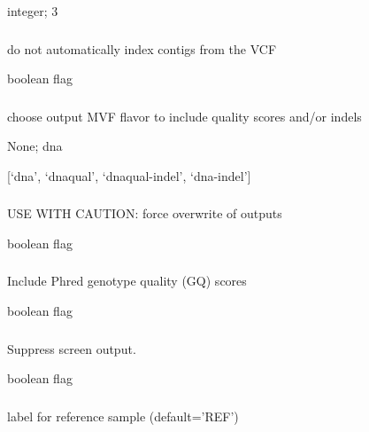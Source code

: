 \documentclass[letterpaper,11pt,english]{sphinxmanual}
\begin{document}
 integer;  3


\subsubsection{}
\label{\detokenize{prog_desc:no-autoindex}}
 do not automatically index contigs from the VCF

 boolean flag


\subsubsection{}
\label{\detokenize{prog_desc:outflavor}}
 choose output MVF flavor to include quality scores and/or indels

 None;  dna

 {[}‘dna’, ‘dnaqual’, ‘dnaqual-indel’, ‘dna-indel’{]}


\subsubsection{}
\label{\detokenize{prog_desc:id36}}
 USE WITH CAUTION: force overwrite of outputs

 boolean flag


\subsubsection{}
\label{\detokenize{prog_desc:qual}}
 Include Phred genotype quality (GQ) scores

 boolean flag


\subsubsection{}
\label{\detokenize{prog_desc:id37}}
 Suppress screen output.

 boolean flag


\subsubsection{}
\label{\detokenize{prog_desc:reflabel}}
 label for reference sample (default=’REF’)
\end{document}
